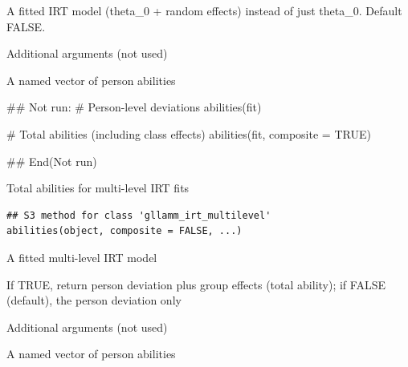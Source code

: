 \documentclass[a4paper]{book}
\begin{document}
%
\begin{Arguments}
\begin{ldescription}
\item[\code{object}] A fitted IRT model
(theta\_0 + random effects) instead of just theta\_0. Default FALSE.

\item[\code{...}] Additional arguments (not used)
\end{ldescription}
\end{Arguments}
%
\begin{Value}
A named vector of person abilities
\end{Value}
%
\begin{Examples}
\begin{ExampleCode}
## Not run: 
# Person-level deviations
abilities(fit)

# Total abilities (including class effects)
abilities(fit, composite = TRUE)

## End(Not run)

\end{ExampleCode}
\end{Examples}
%
\begin{Description}
Total abilities for multi-level IRT fits
\end{Description}
%
\begin{Usage}
\begin{verbatim}
## S3 method for class 'gllamm_irt_multilevel'
abilities(object, composite = FALSE, ...)
\end{verbatim}
\end{Usage}
%
\begin{Arguments}
\begin{ldescription}
\item[\code{object}] A fitted multi-level IRT model

\item[\code{composite}] If TRUE, return person deviation plus group effects
(total ability); if FALSE (default), the person deviation only

\item[\code{...}] Additional arguments (not used)
\end{ldescription}
\end{Arguments}
%
\begin{Value}
A named vector of person abilities
\end{Value}
\end{document}
